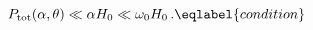 \begin{equation}
P_{\rm tot}(\alpha,\theta) \ll \alpha H_0\ll\omega_0 H_0 \,.
\eqlabel{condition}
\end{equation}

